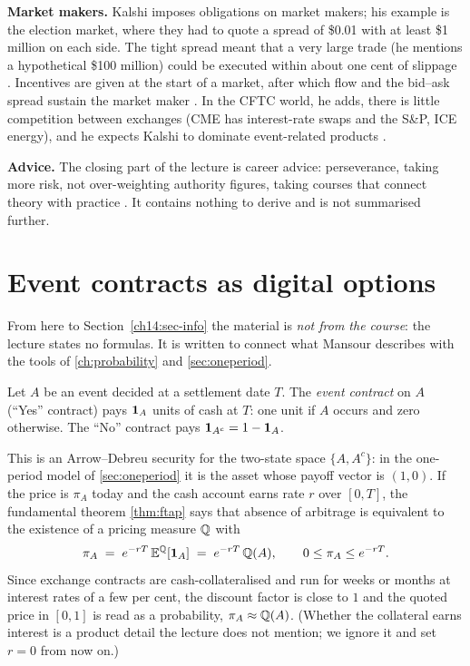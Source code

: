 \begin{paracol}{2}
\textbf{Market makers.} Kalshi imposes obligations on market makers; his example is the election market, where
they had to quote a spread of \$0.01 with at least \$1 million on each side. The tight spread meant that a
very large trade (he mentions a hypothetical \$100 million) could be executed within about one cent of
slippage . Incentives are given at the start of a market, after which
flow and the bid--ask spread sustain the market maker . In the CFTC world, he adds, there is
little competition between exchanges (CME has interest-rate swaps and the S\&P, ICE energy), and he expects
Kalshi to dominate event-related products .

\textbf{Advice.} The closing part of the lecture is career advice: perseverance, taking more risk, not
over-weighting authority figures, taking courses that connect theory with practice
. It contains nothing to derive and is not
summarised further.

\section{Event contracts as digital options}\label{ch14:sec-binary}

\begin{coursenote}[Reconstruction]
From here to Section~\ref{ch14:sec-info} the material is \emph{not from the course}: the lecture states
no formulas. It is written to connect what Mansour describes with the tools of \cref{ch:probability} and
\cref{sec:oneperiod}.
\end{coursenote}

\begin{definition}\label{ch14:def-event}
Let $A$ be an event decided at a settlement date $T$. The \emph{event contract} on $A$ (``Yes'' contract)
pays $\mathbf{1}_A$ units of cash at $T$: one unit if $A$ occurs and zero otherwise. The ``No'' contract pays
$\mathbf{1}_{A^c}=1-\mathbf{1}_A$.
\end{definition}

This is an Arrow--Debreu security for the two-state space $\{A,A^c\}$: in the one-period model of
\cref{sec:oneperiod} it is the asset whose payoff vector is $(1,0)$. If the price is $\pi_A$ today and the cash
account earns rate $r$ over $[0,T]$, the fundamental theorem \cref{thm:ftap} says that absence of arbitrage is
equivalent to the existence of a pricing measure $\mathbb{Q}$ with
\begin{equation}\label{ch14:eq-price}
  \pi_A \;=\; e^{-rT}\,\mathbb{E}^{\mathbb{Q}}[\mathbf{1}_A] \;=\; e^{-rT}\,\mathbb{Q}(A),
  \qquad 0\le \pi_A\le e^{-rT}.
\end{equation}
Since exchange contracts are cash-collateralised and run for weeks or months at interest rates of a few
per cent, the discount factor is close to $1$ and the quoted price in $[0,1]$ is read as a probability,
$\pi_A\approx \mathbb{Q}(A)$. (Whether the collateral earns interest is a product detail the lecture does not
mention; we ignore it and set $r=0$ from now on.)


\end{paracol}
